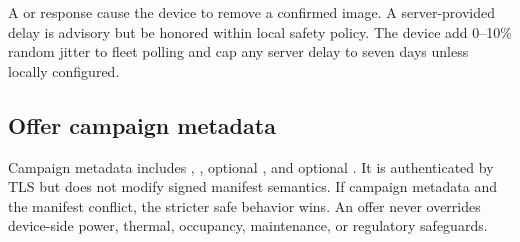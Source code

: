 A  or  response \mustnot cause the device to remove
a confirmed image. A server-provided delay is advisory but \should be honored
within local safety policy. The device \should add 0--10\% random jitter to fleet
polling and \must cap any server delay to seven days unless locally configured.

\subsection{Offer campaign metadata}

Campaign metadata includes , , optional
, and optional . It is authenticated
by TLS but does not modify signed manifest semantics. If campaign metadata and
the manifest conflict, the stricter safe behavior wins. An offer never overrides
device-side power, thermal, occupancy, maintenance, or regulatory safeguards.

